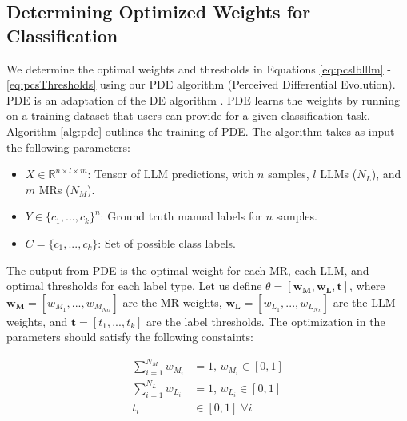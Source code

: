 \subsection{Determining Optimized Weights for Classification}
We determine the optimal weights and thresholds in Equations \ref{eq:pcslblllm} - \ref{eq:pcsThresholds} using our PDE algorithm (Perceived Differential Evolution). PDE is an adaptation of the DE algorithm \cite{Price2013}. PDE learns the weights by running on a training dataset that users can provide for a given classification task. Algorithm \ref{alg:pde} outlines the training of PDE. The algorithm takes as input the following parameters: 
\begin{itemize}[itemsep=0pt,leftmargin=10pt]
    \item $X \in \mathbb{R}^{n \times l \times m}$: Tensor of LLM predictions, with $n$ samples, $l$ LLMs ($N_L$), and $m$ MRs ($N_M$).
    \item $Y \in \{c_1,...,c_k\}^n$: Ground truth manual labels for $n$ samples.
    \item $C = \{c_1,...,c_k\}$: Set of possible class labels.
\end{itemize} The output from PDE is the optimal weight for each MR, each LLM, and optimal thresholds for each label type. Let us define $\theta = [\mathbf{w_M}, \mathbf{w_L}, \mathbf{t}]$, where $\mathbf{w_M} = [w_{M_1},...,w_{M_{N_M}}]$ are the MR weights, $\mathbf{w_L} = [w_{L_1},...,w_{L_{N_L}}]$ are the LLM weights, and $\mathbf{t} = [t_1,...,t_k]$ are the label thresholds. The optimization in the parameters should satisfy the following constaints:


\begin{align*}
\sum_{i=1}^{N_M} w_{M_i} &= 1,\, w_{M_i} \in [0,1]\\
\sum_{i=1}^{N_L} w_{L_i} &= 1,\, w_{L_i} \in [0,1]\\
t_i &\in [0,1] \;\forall i
\end{align*}

